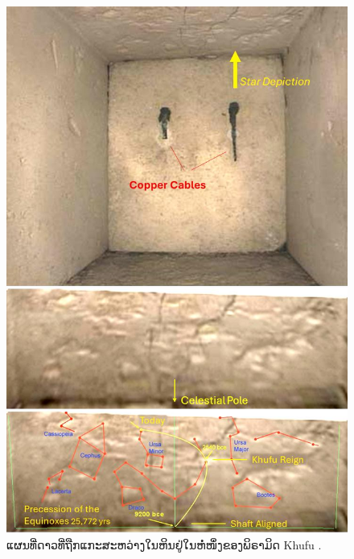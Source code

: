 \documentclass[10pt,twocolumn,letterpaper]{article}
\begin{document}
\begin{figure}[H]
\begin{center}
   \includegraphics[width=1\linewidth]{star-stone.jpg}
\end{center}
   \caption{ແຜນທີ່ດາວທີ່ຖືກແກະສະຫວ່າງໃນຫິນຢູ່ໃນຫໍ່ໜຶ່ງຂອງພິຣາມິດ Khufu \cite{28}.}
\label{fig:20}
\label{fig:onecol}
\end{figure}
\end{document}
